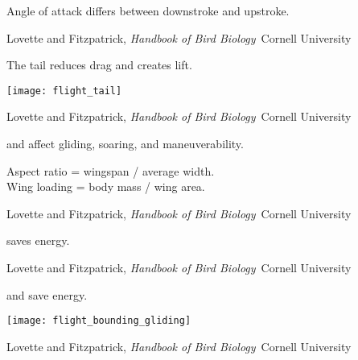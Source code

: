 \documentclass[t]{beamer}
\begin{document}
%
{
\begin{frame}[t,plain]{Angle of attack differs between downstroke and upstroke.}

\vfilll

\tiny \hfill Lovette and Fitzpatrick, \textit{Handbook of Bird Biology} \textcopyright\,Cornell University

\end{frame}
}
%
\begin{frame}[t,plain]{The tail reduces drag and creates lift.}

\vspace{-0.5\baselineskip}

\centering

\texttt{[image: flight\_tail]}

\vfilll

\tiny \hfill Lovette and Fitzpatrick, \textit{Handbook of Bird Biology} \textcopyright\,Cornell University

\end{frame}
%
{
\begin{frame}[t,plain]{ and  affect gliding, soaring, and maneuverability.}

\vspace{11\baselineskip}

\quad Aspect ratio = wingspan / average width. \\
\quad Wing loading = body mass / wing area.

\vfilll

\tiny \hfill Lovette and Fitzpatrick, \textit{Handbook of Bird Biology} \textcopyright\,Cornell University

\end{frame}
}
%
{
\begin{frame}[t,plain]{ saves energy.}

\vfilll

\tiny \hfill Lovette and Fitzpatrick, \textit{Handbook of Bird Biology} \textcopyright\,Cornell University

\end{frame}
}
%
\begin{frame}[t,plain]{ and  save energy.}

\vspace{-0.5\baselineskip}

\centering

\texttt{[image: flight\_bounding\_gliding]}

\vfilll

\tiny \hfill Lovette and Fitzpatrick, \textit{Handbook of Bird Biology} \textcopyright\,Cornell University

\end{frame}
\end{document}
